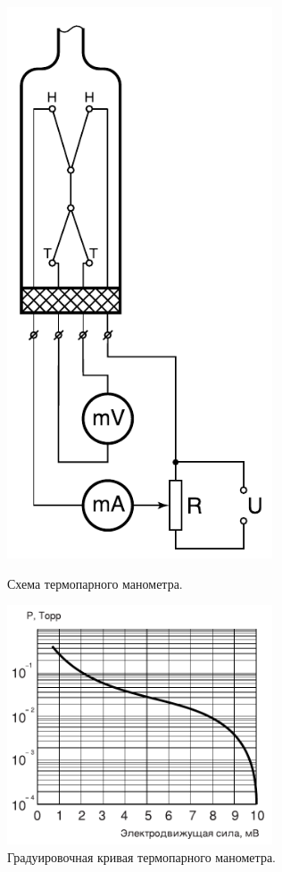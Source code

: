 \documentclass[a4paper,12pt]{article}
\begin{document}
    \begin{figure}[h]
    \centering
    \begin{minipage}{0.3\textwidth}
        \centering
        \includegraphics[width=0.7\textwidth]{termoparni_monometr.png}
        \caption{Схема термопарного манометра.}
        \label{ris:termoparni_monometr}
    \end{minipage}\hfill
    \begin{minipage}{0.7\textwidth}
        \centering
        \includegraphics[width=0.7\textwidth]{termopara_graduirovka.png}
        \caption{Градуировочная кривая термопарного манометра.}
        \label{ris:termopara_graduirovka}
    \end{minipage}
    \end{figure}
\end{document}
